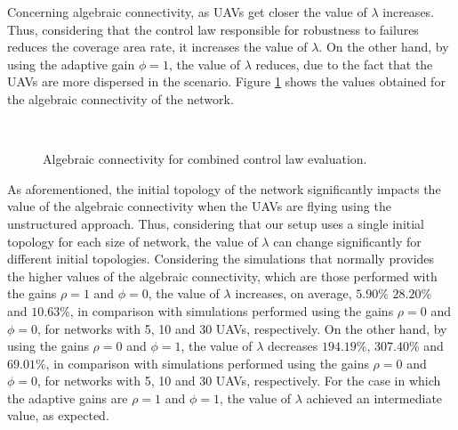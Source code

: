 Concerning algebraic connectivity, as UAVs get closer the value of $\lambda$ increases. Thus, considering that the control law responsible for robustness to failures reduces the coverage area rate, it increases the value of $\lambda$. On the other hand, by using the adaptive gain $\phi=1$, the value of $\lambda$ reduces, due to the fact that the UAVs are more dispersed in the scenario. Figure \ref{fig:unstructuredLambdaRadarOn} shows the values obtained for the algebraic connectivity of the network.

\begin{figure}[hbt!]
      \centering            
         \\ \centering
      \caption{Algebraic connectivity for combined control law evaluation.}
      \label{fig:unstructuredLambdaRadarOn}
\end{figure}


As aforementioned, the initial topology of the network significantly impacts the value of the algebraic connectivity when the UAVs are flying using the unstructured approach. Thus, considering that our setup uses a single initial topology for each size of network, the value of $\lambda$ can change significantly for different initial topologies. Considering the simulations that normally provides the higher values of the algebraic connectivity, which are those performed with the gains $\rho=1$ and $\phi=0$, the value of $\lambda$ increases, on average, $5.90\%$ $28.20\%$ and $10.63\%$, in comparison with simulations performed using the gains $\rho=0$ and $\phi=0$, for networks with 5, 10 and 30 UAVs, respectively. On the other hand, by using the gains $\rho=0$ and $\phi=1$, the value of $\lambda$ decreases $194.19\%$, $307.40\%$ and $69.01\%$, in comparison with simulations performed using the gains $\rho=0$ and $\phi=0$, for networks with 5, 10 and 30 UAVs, respectively. For the case in which the adaptive gains are $\rho=1$ and $\phi=1$, the value of $\lambda$ achieved an intermediate value, as expected. 